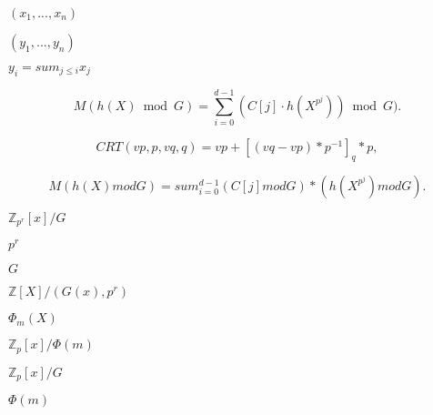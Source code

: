 \documentclass{article}
\begin{document}
$(x_1, ..., x_n)$
\pagebreak

$(y_1, ..., y_n)$
\pagebreak

$y_i = sum_{j\le i} x_j$
\pagebreak

\[ M(h(X) \bmod G)= \sum_{i=0}^{d-1}(C[j] \cdot h(X^{p^j}))\bmod G). \]
\pagebreak

\[ CRT(vp,p,vq,q) = vp + [(vq-vp) * p^{-1}]_q * p, \]
\pagebreak

\[ M(h(X) mod G) = sum_{i=0}^{d-1} (C[j] mod G) * (h(X^{p^j}) mod G).\]
\pagebreak

$\mathbb{Z}_{p^r}[x]/G$
\pagebreak

$p^r$
\pagebreak

$ G$
\pagebreak

$\mathbb{Z}[X]/(G(x),p^r)$
\pagebreak

$\Phi_m(X)$
\pagebreak

$\mathbb{Z}_p[x]/\Phi(m)$
\pagebreak

$\mathbb{Z}_p[x]/G$
\pagebreak

$\Phi(m)$
\pagebreak
\end{document}
